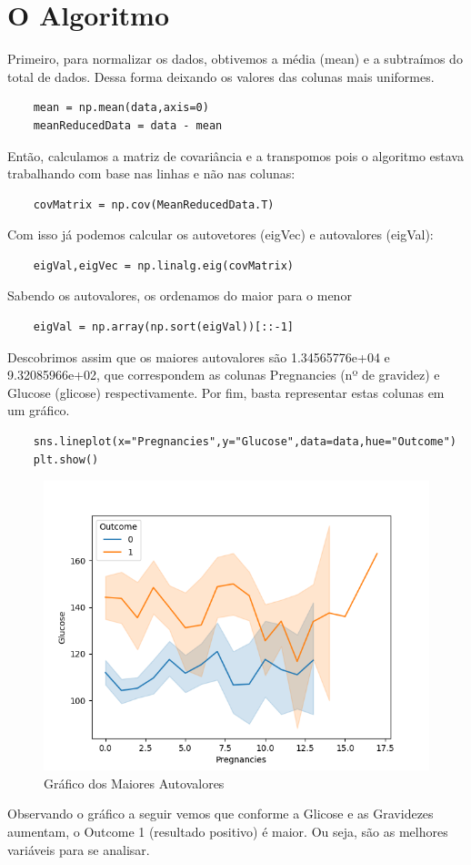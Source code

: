 \documentclass{article}
\begin{document}
\section{O Algoritmo}
Primeiro, para normalizar os dados, obtivemos a média (mean) e a subtraímos do total de dados. Dessa forma deixando os valores das colunas mais uniformes.
\begin{verbatim}
    mean = np.mean(data,axis=0)
    meanReducedData = data - mean
\end{verbatim}
Então, calculamos a matriz de covariância e a transpomos pois o algoritmo estava trabalhando com base nas linhas e não nas colunas:
\begin{verbatim}
    covMatrix = np.cov(MeanReducedData.T)
\end{verbatim}
Com isso já podemos calcular os autovetores (eigVec) e autovalores (eigVal):
\begin{verbatim}
    eigVal,eigVec = np.linalg.eig(covMatrix)
\end{verbatim}
Sabendo os autovalores, os ordenamos do maior para o menor
\begin{verbatim}
    eigVal = np.array(np.sort(eigVal))[::-1]
\end{verbatim}
Descobrimos assim que os maiores autovalores são 1.34565776e+04 e 9.32085966e+02, que correspondem as colunas Pregnancies (nº de gravidez) e Glucose (glicose) respectivamente.
Por fim, basta representar estas colunas em um gráfico.
\begin{verbatim}
    sns.lineplot(x="Pregnancies",y="Glucose",data=data,hue="Outcome")
    plt.show()
\end{verbatim}
\begin{figure}
    \centering 
    \includegraphics{Figure_1.png}
    \caption{Gráfico dos Maiores Autovalores}
    \label{fig:my_label}
\end{figure}
Observando o gráfico a seguir vemos que conforme a Glicose e as Gravidezes aumentam, o Outcome 1 (resultado positivo) é maior. Ou seja, são as melhores variáveis para se analisar.
\end{document}
